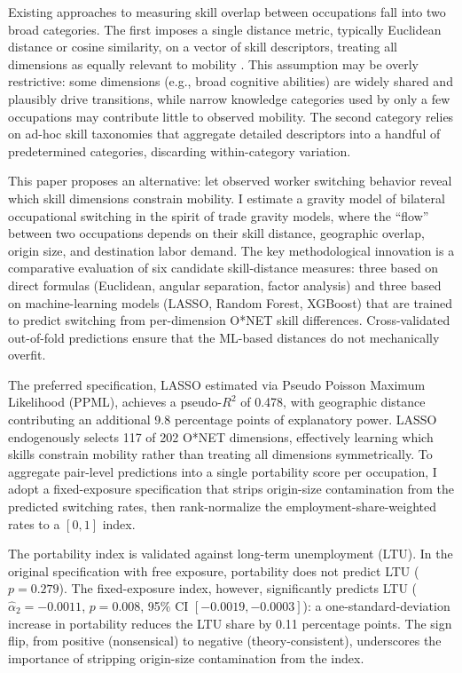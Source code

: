 \documentclass[12pt]{article}
\begin{document}
Existing approaches to measuring skill overlap between occupations fall into two broad categories. The first imposes a single distance metric, typically Euclidean distance or cosine similarity, on a vector of skill descriptors, treating all dimensions as equally relevant to mobility \citep{poletaev2008,gathmann2010}. This assumption may be overly restrictive: some dimensions (e.g., broad cognitive abilities) are widely shared and plausibly drive transitions, while narrow knowledge categories used by only a few occupations may contribute little to observed mobility. The second category relies on ad-hoc skill taxonomies that aggregate detailed descriptors into a handful of predetermined categories, discarding within-category variation.

This paper proposes an alternative: let observed worker switching behavior reveal which skill dimensions constrain mobility. I estimate a gravity model of bilateral occupational switching in the spirit of trade gravity models, where the ``flow'' between two occupations depends on their skill distance, geographic overlap, origin size, and destination labor demand. The key methodological innovation is a comparative evaluation of six candidate skill-distance measures: three based on direct formulas (Euclidean, angular separation, factor analysis) and three based on machine-learning models (LASSO, Random Forest, XGBoost) that are trained to predict switching from per-dimension O*NET skill differences. Cross-validated out-of-fold predictions ensure that the ML-based distances do not mechanically overfit.

The preferred specification, LASSO estimated via Pseudo Poisson Maximum Likelihood (PPML), achieves a pseudo-$R^2$ of 0.478, with geographic distance contributing an additional 9.8 percentage points of explanatory power. LASSO endogenously selects 117 of 202 O*NET dimensions, effectively learning which skills constrain mobility rather than treating all dimensions symmetrically. To aggregate pair-level predictions into a single portability score per occupation, I adopt a fixed-exposure specification that strips origin-size contamination from the predicted switching rates, then rank-normalize the employment-share-weighted rates to a $[0,1]$ index.

The portability index is validated against long-term unemployment (LTU). In the original specification with free exposure, portability does not predict LTU ($p = 0.279$). The fixed-exposure index, however, significantly predicts LTU ($\hat{\alpha}_2 = -0.0011$, $p = 0.008$, 95\% CI $[-0.0019, -0.0003]$): a one-standard-deviation increase in portability reduces the LTU share by 0.11 percentage points. The sign flip, from positive (nonsensical) to negative (theory-consistent), underscores the importance of stripping origin-size contamination from the index.
\end{document}

